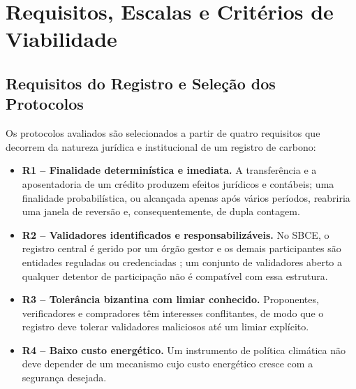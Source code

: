 \section{Requisitos, Escalas e Critérios de Viabilidade}
\label{sec:model}

\subsection{Requisitos do Registro e Seleção dos Protocolos}

Os protocolos avaliados são selecionados a partir de quatro requisitos que decorrem da natureza jurídica e institucional de um registro de carbono:

\begin{itemize}
\item \textbf{R1 -- Finalidade determinística e imediata.} A transferência e a aposentadoria de um crédito produzem efeitos jurídicos e contábeis; uma finalidade probabilística, ou alcançada apenas após vários períodos, reabriria uma janela de reversão e, consequentemente, de dupla contagem.
\item \textbf{R2 -- Validadores identificados e responsabilizáveis.} No SBCE, o registro central é gerido por um órgão gestor e os demais participantes são entidades reguladas ou credenciadas \citep{Lei15042}; um conjunto de validadores aberto a qualquer detentor de participação não é compatível com essa estrutura.
\item \textbf{R3 -- Tolerância bizantina com limiar conhecido.} Proponentes, verificadores e compradores têm interesses conflitantes, de modo que o registro deve tolerar validadores maliciosos até um limiar explícito.
\item \textbf{R4 -- Baixo custo energético.} Um instrumento de política climática não deve depender de um mecanismo cujo custo energético cresce com a segurança desejada.
\end{itemize}

